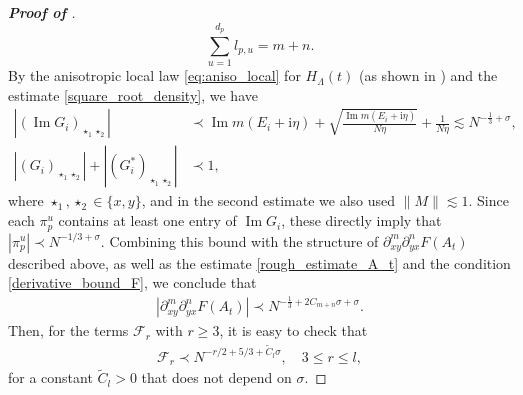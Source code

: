 \documentclass[10pt,reqno]{amsart}
\numberwithin{equation}{section}
\numberwithin{figure}{section}
\theoremstyle{plain} %
\theoremstyle{definition} %
\newcommand{\cal}{\mathcal}
\newcommand{\wt}{\widetilde}
\newcommand{\ii}{\mathrm{i}}
\renewcommand{\geq}{\ge}
\newcommand{\pa}[1]{\left({#1}\right)}
\newcommand{\ha}[1]{\left\{{#1}\right\}}
\newcommand{\absa}[1]{\left\lvert #1 \right\rvert}
\DeclareMathOperator{\im}{\mathrm{Im}}
\newcommand{\bu}{{\bf{u}}}
\numberwithin{equation}{section}
\begin{document}
\begin{proof}[\bf Proof of ]
\[\sum_{u=1}^{d_p}l_{p,u}=m+n.\] 
By the anisotropic local law \eqref{eq:aniso_local} for $H_\Lambda(t)$ (as shown in ) and the estimate \eqref{square_root_density}, we have
\begin{align}
        \absa{ \pa{\im G_i}_{\star_1\star_2}}&\prec \im m\pa{E_i+\ii \eta}+\sqrt{\frac{\im m\pa{E_i+\ii \eta}}{N\eta}}+\frac{1}{N\eta}\lesssim N^{-\frac 1 3+\sigma},\label{single_resolvent_local_law_bound}\\
        \absa{ \pa{G_i}_{\star_1\star_2}}+\absa{ \pa{G_i^*}_{\star_1\star_2}} &\prec 1,\label{single_resolvent_local_law_bound2}
\end{align}
where $\star_1,\star_2\in \{x,y\}$, and in the second estimate we also used $\|M\|\lesssim 1$. Since each $\pi_p^u$ contains at least one entry of $\im G_i$, these directly imply that $\absa{\pi_p^u}\prec N^{-1/3+\sigma}$. Combining this bound with the structure of $\partial_{xy}^m \partial_{yx}^n F(A_t)$ described above, as well as the estimate \eqref{rough_estimate_A_t} and the condition \eqref{derivative_bound_F}, we conclude that
\begin{equation}\nonumber
    \begin{aligned}        \absa{\partial_{xy}^{m}\partial_{yx}^{n}F\pa{A_t}}\prec N^{-\frac 1 3+2C_{m+n}\sigma+\sigma}.
    \end{aligned}
\end{equation}
Then, for the terms $\cal F_r$ with $r\ge 3$, it is easy to check that
\begin{equation}\label{eq:Fk}
    \begin{aligned}
        \cal F_r \prec N^{-r/2+5/3+\wt C_l\sigma},\quad 3\le r\le l,
    \end{aligned}
\end{equation}
for a constant $\wt C_l>0$ that does not depend on $\sigma$.



\end{proof}
\end{document}

